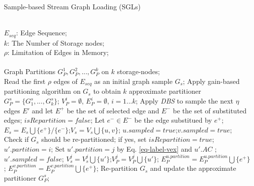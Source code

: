 \documentclass{sig-alternate-2013}
\begin{document}
\begin{algorithm}[h]
\renewcommand{\algorithmicrequire}{\textbf{Input:}}
\renewcommand\algorithmicensure {\textbf{Output:} }
\caption{Sample-based Stream Graph Loading (SGLs)}
\label{alg:streaming-loading}
\begin{algorithmic}[1]
\REQUIRE ~~\\
$E_{seq}$: Edge Sequence;\\
$k$: The Number of Storage nodes;\\
$\rho$: Limitation of Edges in Memory;\\
\ENSURE ~~\\
Graph Partitions $G_P^1,G_P^2,...,G_P^k$ on $k$ storage-nodes;\\

\STATE Read the first $\rho$ edges of $E_{seq}$ as an initial graph sample $G_s$;
\STATE Apply gain-based partitioning algorithm on $G_s$ to obtain $k$ approximate partitioner $G_P^s=\{G_1^s,...,G_k^s\}$;
\STATE $V_P^i=\emptyset$, $E_P^i=\emptyset$, $i=1...k$;
\REPEAT
   \STATE Apply \textit{DBS} to sample the next $\eta$ edges $E'$ and let $E^+$ be the set of selected edge and $E^-$ be the set of substituted edges;
   \STATE $isRepartition = false$;
     \label{alg-sgl-stream-adjust-partitioner-begin}
       \STATE Let $e^- \in E^-$ be the edge substitued by $e^+$;
        \STATE $E_s = E_s\bigcup\{e^+\}/\{e^-\}$;$V_s = V_s \bigcup \{u,v\}$;
        \STATE $u.sampled = true$;$ v.sampled = true$;
        \STATE Check if $G_s$ should be re-partitioned; if yes, set $isRepartition = true$;\label{alg-sgl-stream-adjust-partitioner-end}
     \ELSE
         \label{alg-sgl-stream-allocate-edge-begin}
	            \STATE $u'.partition = i$;
            \ELSE
	            \STATE Set $u'.partition=j$ by Eq. \ref{eq-label-vex} and $u'.AC$ ;
                \STATE $u'.sampled=false$;
                \STATE $V_s^j = V_s^j\bigcup\{u'\}$;$V_P^j = V_P^j\bigcup\{u'\}$;
            \ENDIF
        \ENDFOR
        \STATE $E_P^{u.partition}=E_P^{u.partition}\bigcup\{e^+\}$;
        \STATE $E_P^{v.partition}=E_P^{v.partition}\bigcup\{e^+\}$;
       \ENDIF \label{alg-sgl-stream-allocate-edge-end}
      \ENDFOR
      \label{alg-sgl-stream-repartition-begin}
        \STATE Re-partition $G_s$ and update the approximate partitioner $G_P^s$;
      \ENDIF \label{alg-sgl-stream-repartition-end}

\end{algorithmic}
\end{algorithm}
\end{document}

